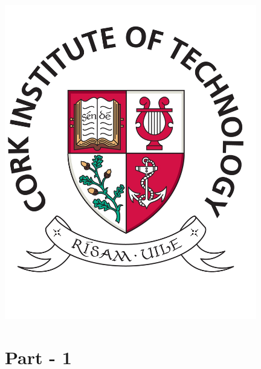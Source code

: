\documentclass[13pt]{report}
\begin{document}
\begin{titlepage}
\includegraphics[width=110mm,scale=0.5]{cit.jpg}\\%
 

\vfill %

\end{titlepage}

\section* {Part - 1}
\end{document}
